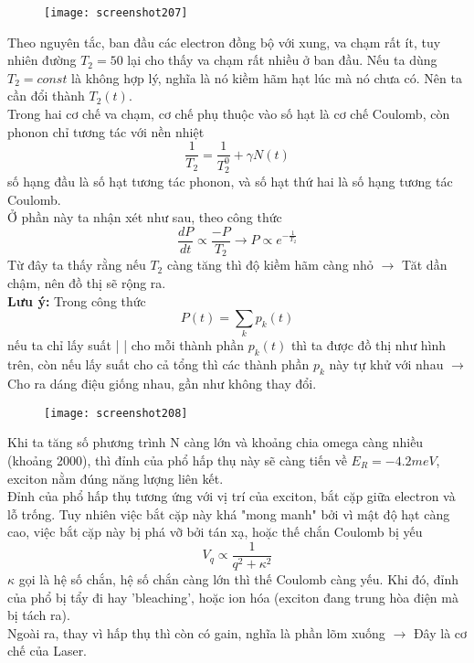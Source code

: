 \documentclass[16Pt]{article}
\begin{document}
	\begin{figure}[h!]
		\centering
		\texttt{[image: screenshot207]}
	\end{figure}
	Theo nguyên tắc, ban đầu các electron đồng bộ với xung, va chạm rất ít, tuy nhiên đường $T_2 = 50$ lại cho thấy va chạm rất nhiều ở ban đầu. Nếu ta dùng $T_2=const$ là không hợp lý, nghĩa là nó kiềm hãm hạt lúc mà nó chưa có. Nên ta cần đổi thành $T_2(t)$.\\
	Trong hai cơ chế va chạm, cơ chế phụ thuộc vào số hạt là cơ chế Coulomb, còn phonon chỉ tương tác với nền nhiệt
	\[
	\frac{1}{T_2} = \frac{1}{T_2^0} + \gamma N(t)
	\]
	số hạng đầu là số hạt tương tác phonon, và số hạt thứ hai là số hạng tương tác Coulomb.\\
	Ở phần này ta nhận xét như sau, theo công thức 
	\[
	\frac{dP}{dt} \propto \frac{-P}{T_2} \rightarrow P \propto e^{-\frac{1}{T_2}}
	\]
	Từ đây ta thấy rằng nếu $T_2$ càng tăng thì độ kiềm hãm càng nhỏ $\rightarrow$ Tăt dần chậm, nên đồ thị sẽ rộng ra. \\
	\noindent \textbf{Lưu ý:} Trong công thức 
	\[
	P(t) = \sum_k p_k(t)
	\]
	nếu ta chỉ lấy suất | | cho mỗi thành phần $p_k(t)$ thì ta được đồ thị như hình trên, còn nếu lấy suất cho cả tổng thì các thành phần $p_k$ này tự khử với nhau $\rightarrow$ Cho ra dáng điệu giống nhau, gần như không thay đổi.
	
	\begin{figure}[h!]
		\centering
		\texttt{[image: screenshot208]}
	\end{figure}
	Khi ta tăng số phương trình N càng lớn và khoảng chia omega càng nhiều (khoảng 2000), thì đỉnh của phổ hấp thụ này sẽ càng tiến về $E_R = -4.2 meV$, exciton nằm đúng năng lượng liên kết.\\
	Đỉnh của phổ hấp thụ tương ứng với vị trí của exciton, bắt cặp giữa electron và lỗ trống. Tuy nhiên việc bắt cặp này khá "mong manh" bởi vì mật độ hạt càng cao, việc bắt cặp này bị phá vỡ bởi tán xạ, hoặc thế chắn Coulomb bị yếu 
	\[
	V_q \propto \frac{1}{q^2 + \kappa^2}
	\]
	$\kappa$ gọi là hệ số chắn, hệ số chắn càng lớn thì thế Coulomb càng yếu.
	Khi đó, đỉnh của phổ bị tẩy đi hay 'bleaching', hoặc ion hóa (exciton đang trung hòa điện mà bị tách ra).\\
	Ngoài ra, thay vì hấp thụ thì còn có gain, nghĩa là phần lõm xuống $\rightarrow$ Đây là cơ chế của Laser.\\
	
	\newpage
	
\end{document}
